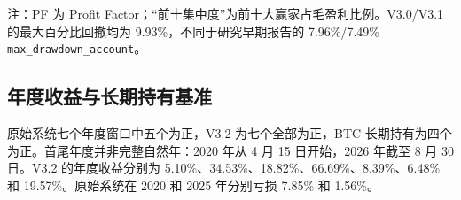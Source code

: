\begin{table}[H]
  \centering
  \caption{V2、V3.0、V3.1 与 V3.2 的统一口径完整历史比较}
  \label{tab:version-comparison}
  \vspace{0.3em}

  \footnotesize\raggedright 注：PF 为 Profit Factor；“前十集中度”为前十大赢家占毛盈利比例。V3.0/V3.1 的最大百分比回撤均为 9.93\%，不同于研究早期报告的 7.96\%/7.49\% \texttt{max\_drawdown\_account}。
\end{table}

\subsection{年度收益与长期持有基准}

原始系统七个年度窗口中五个为正，V3.2 为七个全部为正，BTC 长期持有为四个为正。首尾年度并非完整自然年：2020 年从 4 月 15 日开始，2026 年截至 8 月 30 日。V3.2 的年度收益分别为 5.10\%、34.53\%、18.82\%、66.69\%、8.39\%、6.48\% 和 19.57\%。原始系统在 2020 和 2025 年分别亏损 7.85\% 和 1.56\%。


